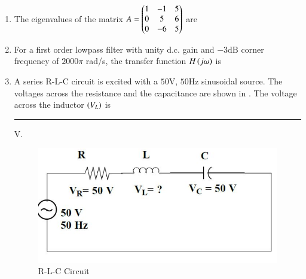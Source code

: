 \documentclass[journal,12pt,onecolumn]{IEEEtran}
\theoremstyle{remark}
\begin{document}
\begin{enumerate}
\item The eigenvalues of the matrix 
$A = \begin{pmatrix}1 & -1 & 5 \\ 0 & 5 & 6 \\ 0 & -6 & 5 \end{pmatrix}$
are  \par \hfill{}
\begin{enumerate}
\end{enumerate}

\item For a first order lowpass filter with unity d.c. gain and $-3\text{dB}$ corner frequency of $2000\pi$ rad/s, the transfer function $H\left(j\omega\right)$ is \par \hfill{}
\begin{enumerate}
\end{enumerate}

\item A series R-L-C circuit is excited with a $50\text{V}$, $50\text{Hz}$ sinusoidal source. The voltages across the resistance and the capacitance are shown in . The voltage across the inductor $\left(V_L\right)$ is \rule{1.5cm}{0.4pt} $\text{V}$.
\begin{figure}[H]
    \centering
    \includegraphics[width=0.5\columnwidth]{Figs/Q-6.png}
    \caption{R-L-C Circuit}
    \label{fig:placeholder_2}
\end{figure}\par \hfill{}


\end{enumerate}
\end{document}
